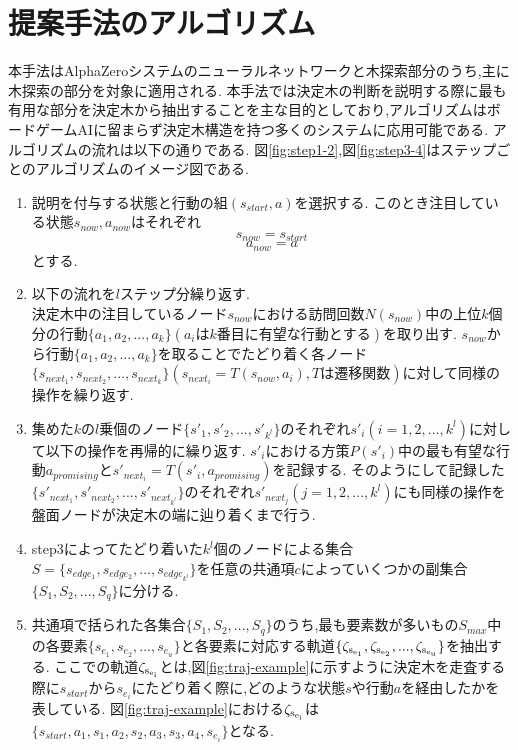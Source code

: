\section{提案手法のアルゴリズム}
本手法はAlphaZeroシステムのニューラルネットワークと木探索部分のうち,主に木探索の部分を対象に適用される.
本手法では決定木の判断を説明する際に最も有用な部分を決定木から抽出することを主な目的としており,アルゴリズムはボードゲームAIに留まらず決定木構造を持つ多くのシステムに応用可能である.
アルゴリズムの流れは以下の通りである.
図\ref{fig:step1-2},図\ref{fig:step3-4}はステップごとのアルゴリズムのイメージ図である.
\begin{enumerate}
    \item 説明を付与する状態と行動の組$(s_{start}, a)$を選択する.
    このとき注目している状態$s_{now}, a_{now}$はそれぞれ
    \begin{equation}
        {s_{now}=s_{start}}
    \end{equation}
    \begin{equation}
        {a_{now}=a}
    \end{equation}
    とする.
    \item 以下の流れを$l$ステップ分繰り返す.\\
    決定木中の注目しているノード$s_{now}$における訪問回数$N(s_{now})$中の上位$k$個分の行動$\{a_1, a_2, ..., a_{k}\}(a_iはk番目に有望な行動とする)$を取り出す.
    $s_{now}$から行動$\{a_1, a_2, ..., a_{k}\}$を取ることでたどり着く各ノード\\
    $\{s_{next_1}, s_{next_2}, ..., s_{next_{k}}\}(s_{next_i}=T(s_{now}, a_i), Tは遷移関数)$に対して同様の操作を繰り返す.
    
    
    \item 集めた$k$の$l$乗個のノード$\{{s}'_{1}, {s'}_{2}, ..., {s'}_{k^l}\}$のそれぞれ${s'}_{i}(i=1, 2, ..., k^l)$に対して以下の操作を再帰的に繰り返す.
    ${s'}_{i}$における方策$P({s'}_{i})$中の最も有望な行動$a_{promising}$と${s'}_{next_i}=T({s'}_i, a_{promising})$を記録する.
    そのようにして記録した$\{{s'}_{next_1}, {s'}_{next_2}, ..., {s'}_{next_{k^l}}\}$のそれぞれ${s'}_{next_j}(j=1, 2, ..., k^l)$にも同様の操作を盤面ノードが決定木の端に辿り着くまで行う.
    \item step3によってたどり着いた$k^l$個のノードによる集合$S=\{s_{edge_1}, s_{edge_2}, ..., s_{edge_{k^l}}\}$を任意の共通項$c$によっていくつかの副集合$\{S_1, S_2, ..., S_q\}$に分ける.
    \item 共通項で括られた各集合$\{S_1, S_2, ..., S_q\}$のうち,最も要素数が多いもの$S_{max}$中の各要素$\{s_{e_1}, s_{e_2}, ...,  s_{e_u}\}$と各要素に対応する軌道$\{\rm{{\zeta}_{s_{e_1}}}, \rm{{\zeta}_{s_{e_2}}}, ...,  \rm{{\zeta}_{s_{e_u}}}\}$を抽出する.
    ここでの軌道$\rm{{\zeta}_{s_{e_i}}}$とは,図\ref{fig:traj-example}に示すように決定木を走査する際に$s_{start}$から$s_{e_i}$にたどり着く際に,どのような状態$s$や行動$a$を経由したかを表している.
    図\ref{fig:traj-example}における$\rm{{\zeta}_{s_{e_i}}}$は$\{s_{start}, a_1, s_1, a_2, s_2, a_3, s_3, a_4, s_{e_i}\}$となる.

\end{enumerate}



